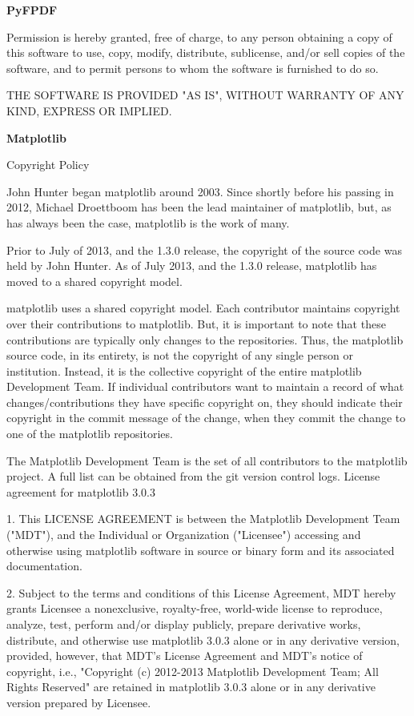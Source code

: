 \textbf{PyFPDF}

Permission is hereby granted, free of charge, to any person obtaining a copy of this software to use, copy, modify, distribute, sublicense, and/or sell copies of the software, and to permit persons to whom the software is furnished to do so.

THE SOFTWARE IS PROVIDED "AS IS", WITHOUT WARRANTY OF ANY KIND, EXPRESS OR IMPLIED.

\textbf{Matplotlib}

Copyright Policy

John Hunter began matplotlib around 2003. Since shortly before his passing in 2012, Michael Droettboom has been the lead maintainer of matplotlib, but, as has always been the case, matplotlib is the work of many.

Prior to July of 2013, and the 1.3.0 release, the copyright of the source code was held by John Hunter. As of July 2013, and the 1.3.0 release, matplotlib has moved to a shared copyright model.

matplotlib uses a shared copyright model. Each contributor maintains copyright over their contributions to matplotlib. But, it is important to note that these contributions are typically only changes to the repositories. Thus, the matplotlib source code, in its entirety, is not the copyright of any single person or institution. Instead, it is the collective copyright of the entire matplotlib Development Team. If individual contributors want to maintain a record of what changes/contributions they have specific copyright on, they should indicate their copyright in the commit message of the change, when they commit the change to one of the matplotlib repositories.

The Matplotlib Development Team is the set of all contributors to the matplotlib project. A full list can be obtained from the git version control logs.
License agreement for matplotlib 3.0.3

1. This LICENSE AGREEMENT is between the Matplotlib Development Team ("MDT"), and the Individual or Organization ("Licensee") accessing and otherwise using matplotlib software in source or binary form and its associated documentation.

2. Subject to the terms and conditions of this License Agreement, MDT hereby grants Licensee a nonexclusive, royalty-free, world-wide license to reproduce, analyze, test, perform and/or display publicly, prepare derivative works, distribute, and otherwise use matplotlib 3.0.3 alone or in any derivative version, provided, however, that MDT's License Agreement and MDT's notice of copyright, i.e., "Copyright (c) 2012-2013 Matplotlib Development Team; All Rights Reserved" are retained in matplotlib 3.0.3 alone or in any derivative version prepared by Licensee.

